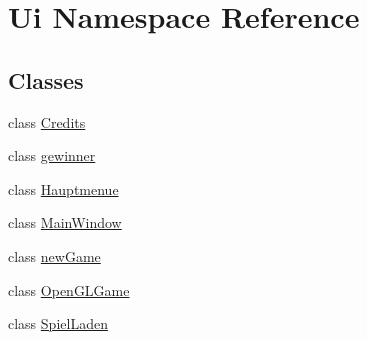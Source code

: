 \hypertarget{namespaceUi}{\section{Ui Namespace Reference}
\label{namespaceUi}
}
\subsection*{Classes}
\begin{DoxyCompactItemize}
\item 
class \hyperlink{classUi_1_1Credits}{Credits}
\item 
class \hyperlink{classUi_1_1gewinner}{gewinner}
\item 
class \hyperlink{classUi_1_1Hauptmenue}{Hauptmenue}
\item 
class \hyperlink{classUi_1_1MainWindow}{Main\-Window}
\item 
class \hyperlink{classUi_1_1newGame}{new\-Game}
\item 
class \hyperlink{classUi_1_1OpenGLGame}{Open\-G\-L\-Game}
\item 
class \hyperlink{classUi_1_1SpielLaden}{Spiel\-Laden}
\end{DoxyCompactItemize}
